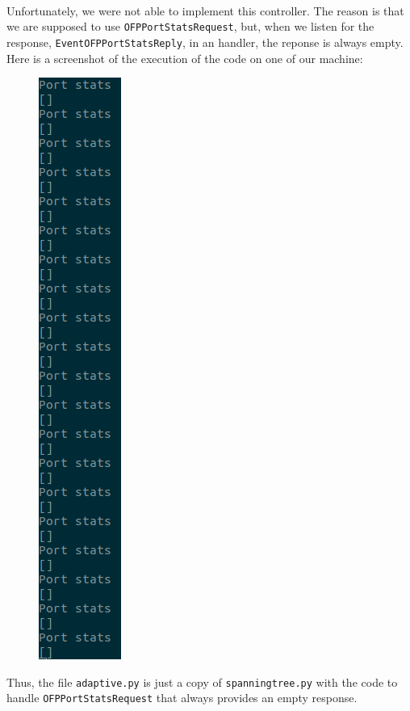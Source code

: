 \documentclass[a4paper, 11pt, oneside]{article}
\begin{document}
\paragraph{}Unfortunately, we were not able to implement this controller. The reason is that we are supposed to use \texttt{OFPPortStatsRequest}, but, when we listen for the response, \texttt{EventOFPPortStatsReply}, in an handler, the reponse is always empty. Here is a screenshot of the execution of the code on one of our machine:
\begin{figure}[H]
\centering
\includegraphics[scale=0.3]{port_stats.png}
\end{figure}
Thus, the file \texttt{adaptive.py} is just a copy of \texttt{spanningtree.py} with the code to handle \texttt{OFPPortStatsRequest} that always provides an empty response.

\end{document}
